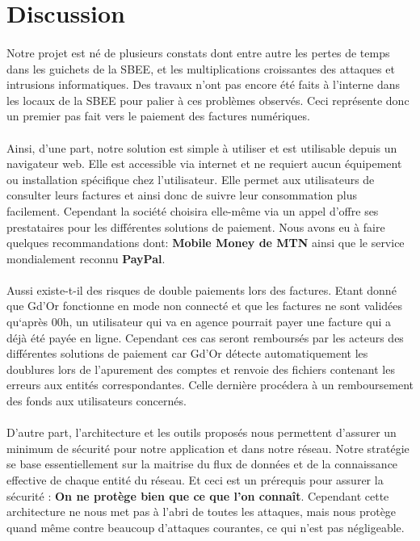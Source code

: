 	      
    \section{Discussion}
	  \paragraph{}
	      Notre projet est né de plusieurs constats dont entre autre les pertes de temps dans les guichets de la SBEE, et les multiplications croissantes des attaques et intrusions informatiques. Des travaux n'ont pas encore \'et\'e faits \`a l'interne dans les locaux de la SBEE pour palier \`a ces probl\`emes observ\'es. Ceci repr\'esente donc un premier pas fait vers le paiement des factures num\'eriques.
	      
	  \paragraph{}
	      Ainsi, d'une part, notre solution est simple à utiliser et est utilisable depuis un navigateur web. Elle est accessible via internet et ne requiert aucun équipement ou installation spécifique chez l'utilisateur. Elle permet aux utilisateurs de consulter leurs factures et ainsi donc de suivre leur consommation plus facilement. Cependant la soci\'et\'e choisira elle-m\^eme via un appel d'offre ses prestataires pour les diff\'erentes solutions de paiement. Nous avons eu \`a faire quelques recommandations dont: \textbf{Mobile Money de MTN} ainsi que le service mondialement reconnu \textbf{PayPal}.
	      
	  \paragraph{}
	      Aussi existe-t-il des risques de double paiements lors des factures. Etant donn\'e que Gd'Or fonctionne en mode non connect\'e et que les factures ne sont valid\'ees qu`apr\`es 00h, un utilisateur qui va en agence pourrait payer une facture qui a d\'ej\`a \'et\'e pay\'ee en ligne. Cependant ces cas seront rembours\'es par les acteurs des diff\'erentes solutions de paiement car Gd'Or d\'etecte automatiquement les doublures lors de l'apurement des comptes et renvoie des fichiers contenant les erreurs aux entit\'es correspondantes. Celle derni\`ere proc\'edera \`a un remboursement des fonds aux utilisateurs concern\'es.

	  \paragraph{}
	      D'autre part, l'architecture et les outils propos\'es nous permettent d'assurer un minimum de s\'ecurit\'e pour notre application et dans notre r\'eseau. Notre strat\'egie se base essentiellement sur la maitrise du flux de donn\'ees et de la connaissance effective de chaque entit\'e du r\'eseau. Et ceci est un prérequis pour assurer la sécurité : \textbf{On ne protège bien que ce que l’on connaît}. Cependant cette architecture ne nous met pas à l’abri de toutes les attaques, mais nous prot\`ege quand m\^eme contre beaucoup d'attaques courantes, ce qui n’est pas négligeable.

